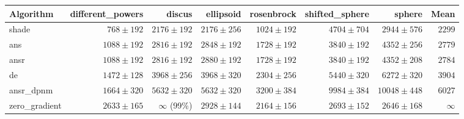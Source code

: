 \begin{tabular}{lrrrrrrr}
\toprule
Algorithm & different\_powers & discus & ellipsoid & rosenbrock & shifted\_sphere & sphere & Mean \\
\midrule
shade & $768 \pm 192$ & $2176 \pm 192$ & $2176 \pm 256$ & $1024 \pm 192$ & $4704 \pm 704$ & $2944 \pm 576$ & $2299$ \\
ans & $1088 \pm 192$ & $2816 \pm 192$ & $2848 \pm 192$ & $1728 \pm 192$ & $3840 \pm 192$ & $4352 \pm 256$ & $2779$ \\
ansr & $1088 \pm 192$ & $2816 \pm 192$ & $2880 \pm 192$ & $1728 \pm 192$ & $3840 \pm 192$ & $4352 \pm 208$ & $2784$ \\
de & $1472 \pm 128$ & $3968 \pm 256$ & $3968 \pm 320$ & $2304 \pm 256$ & $5440 \pm 320$ & $6272 \pm 320$ & $3904$ \\
ansr\_dpnm & $1664 \pm 320$ & $5632 \pm 320$ & $5632 \pm 320$ & $3200 \pm 384$ & $9984 \pm 384$ & $10048 \pm 448$ & $6027$ \\
zero\_gradient & $2633 \pm 165$ & $\infty$ (99\%) & $2928 \pm 144$ & $2164 \pm 156$ & $2693 \pm 152$ & $2646 \pm 168$ & $\infty$ \\
\bottomrule
\end{tabular}
